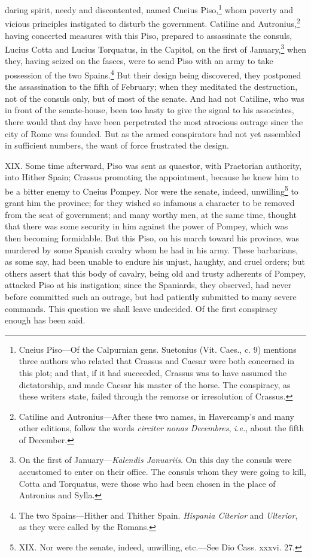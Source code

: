 daring spirit, needy and discontented, named Cneius Piso,\footnote{Cneius Piso—Of the Calpurnian gens. Suetonius (Vit. Caes., c. 9)
mentions three authors who related that Crassus and Caesar were both
concerned in this plot; and that, if it had succeeded, Crassus was to
have assumed the dictatorship, and made Caesar his master of the horse.
The conspiracy, as these writers state, failed through the remorse or
irresolution of Crassus.} whom
poverty and vicious principles instigated to disturb the government.
Catiline and Autronius,\footnote{Catiline and Autronius—After these two names, in Havercamp's
and many other editions, follow the words \emph{circiter nonas Decembres},
\emph{i.e.}, about the fifth of December.} having concerted measures with this Piso,
prepared to assassinate the consuls, Lucius Cotta and Lucius Torquatus,
in the Capitol, on the first of January,\footnote{On the first of January—\emph{Kalendis Januariis}. On this day the
consuls were accustomed to enter on their office. The consuls whom
they were going to kill, Cotta and Torquatus, were those who had been
chosen in the place of Antronius and Sylla.} when they, having seized
on the fasces, were to send Piso with an army to take possession of the
two Spains.\footnote{The two Spains—Hither and Thither Spain. \emph{Hispania Citerior}
and \emph{Ulterior}, as they were called by the Romans.} But their design being discovered, they postponed the
assassination to the fifth of February; when they meditated the
destruction, not of the consuls only, but of most of the senate. And had
not Catiline, who was in front of the senate-house, been too hasty to
give the signal to his associates, there would that day have been
perpetrated the most atrocious outrage since the city of Rome was
founded. But as the armed conspirators had not yet assembled in
sufficient numbers, the want of force frustrated the design.

XIX. Some time afterward, Piso was sent as quaestor, with Praetorian
authority, into Hither Spain; Crassus promoting the appointment,
because he knew him to be a bitter enemy to Cneius Pompey. Nor were
the senate, indeed, unwilling\footnote{XIX. Nor were the senate, indeed, unwilling, etc.—See Dio Cass.
xxxvi. 27.} to grant him the province; for they
wished so infamous a character to be removed from the seat of
government; and many worthy men, at the same time, thought that there
was some security in him against the power of Pompey, which was then
becoming formidable. But this Piso, on his march toward his province,
was murdered by some Spanish cavalry whom he had in his army. These
barbarians, as some say, had been unable to endure his unjust,
haughty, and cruel orders; but others assert that this body of
cavalry, being old and trusty adherents of Pompey, attacked Piso at
his instigation; since the Spaniards, they observed, had never before
committed such an outrage, but had patiently submitted to many severe
commands. This question we shall leave undecided. Of the first
conspiracy enough has been said.

